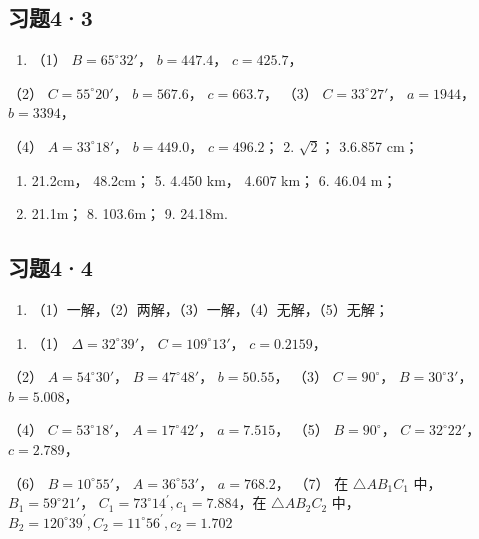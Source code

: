 \subsection{习题4·3}

\begin{enumerate}
\item
  （1） \(B = 65^{\circ}32'\)， \(b = 447.4\)， \(c = 425.7\)，
\end{enumerate}

（2） \(C = 55^{\circ}20'\)， \(b = 567.6\)， \(c = 663.7\)， （3）
\(C = 33^{\circ}27'\)， \(a = 1944\)， \(b = 3394\)，

（4） \(A = 33^{\circ}18'\)， \(b = 449.0\)， \(c = 496.2\)； 2.
\(\sqrt{2}\)； 3.6.857 cm；

\begin{enumerate}[start=4]
\item
  21.2cm， 48.2cm； 5. 4.450 km， 4.607 km； 6. 46.04 m；
\item
  21.1m； 8. 103.6m； 9. 24.18m.
\end{enumerate}

\subsection{习题4·4}

\begin{enumerate}[start=1]
\item
  （1）一解，（2）两解，（3）一解，（4）无解，（5）无解；
\end{enumerate}

\begin{enumerate}[start=2]
\item
  （1） \(\Delta = 32^{\circ}39'\)， \(C = 109^{\circ}13'\)，
  \(c = 0.2159\)，
\end{enumerate}

（2） \(A = 54^{\circ}30'\)， \(B = 47^{\circ}48'\)， \(b = 50.55\)，
（3） \(C = 90^{\circ}\)， \(B = 30^{\circ}3'\)， \(b = 5.008\)，

（4） \(C = 53^{\circ}18'\)， \(A = 17^{\circ}42'\)， \(a = 7.515\)，
（5） \(B = 90^{\circ}\)， \(C = 32^{\circ}22'\)， \(c = 2.789\)，

（6） \(B = 10^{\circ}55'\)， \(A = 36^{\circ}53'\)， \(a = 768.2\)，
（7） 在 \(\triangle AB_{1}C_{1}\) 中， \(B_{1} = 59^{\circ}21'\)，
\(C_{1} = 73^{\circ}14^{\prime}, c_{1} = 7.884\)，在
\(\triangle AB_{2}C_{2}\)
中，\(B_{2} = 120^{\circ}39^{\prime}, C_{2} = 11^{\circ}56^{\prime}, c_{2} = 1.702\)

